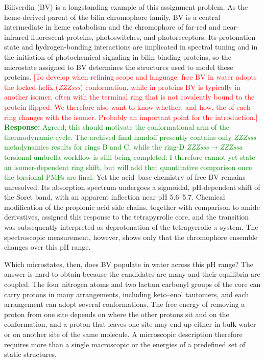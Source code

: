 Biliverdin (BV) is a longstanding example of this assignment problem.
As the heme-derived parent of the bilin chromophore family, BV is a central intermediate in heme catabolism and the chromophore of far-red and near-infrared fluorescent proteins, photoswitches, and photoreceptors.\cite{tenhunen_microsomal_1969,chernovNearInfraredFluorescentProteins2017,tangRedEdgeBilinBinding2021}
Its protonation state and hydrogen-bonding interactions are implicated in spectral tuning and in the initiation of photochemical signaling in bilin-binding proteins,\cite{modiProtonationBiliverdinIXa2019a,shankarUltrafastRemotecontrolledProtonation2025,songRedGreenCyanobacteriochrome2015,tohProtontransferHydrogenbondInteractions2010a,yangUltrafastProtoncoupledIsomerization2022a} so the microstate assigned to BV determines the structures used to model these proteins.
\textcolor{red}{[To develop when refining scope and language: free BV in water adopts the locked-helix (\textit{ZZZsss}) conformation, while in proteins BV is typically in another isomer, often with the terminal ring that is not covalently bound to the protein flipped. We therefore also want to know whether, and how, the \pka{} of each ring changes with the isomer. Probably an important point for the introduction.]}
\textcolor{green}{\textbf{Response:} Agreed; this should motivate the conformational arm of the thermodynamic cycle. The archived final handoff presently contains only \textit{ZZZsss} metadynamics results for rings B and C, while the ring-D \textit{ZZZsss}$\rightarrow$\textit{ZZZssa} torsional umbrella workflow is still being completed. I therefore cannot yet state an isomer-dependent ring \pka{} shift, but will add that quantitative comparison once the torsional PMFs are final.}
Yet the acid--base chemistry of free BV remains unresolved.
Its absorption spectrum undergoes a sigmoidal, pH-dependent shift of the Soret band, with an apparent inflection near pH 5.6--5.7.
Chemical modification of the propionic acid side chains, together with comparison to amide derivatives, assigned this response to the tetrapyrrolic core, and the transition was subsequently interpreted as deprotonation of the tetrapyrrolic $\pi$ system.\cite{shangBiliverdinAmidesReveal2010}
The spectroscopic measurement, however, shows only that the chromophore ensemble changes over this pH range.

Which microstates, then, does BV populate in water across this pH range?
The answer is hard to obtain because the candidates are many and their equilibria are coupled.
The four nitrogen atoms and two lactam carbonyl groups of the core can carry protons in many arrangements, including keto--enol tautomers, and each arrangement can adopt several conformations.\cite{villegas-escobarKetoEnolTautomerism2021a,tongManyRoadsSeam2026}
The free energy of removing a proton from one site depends on where the other protons sit and on the conformation, and a proton that leaves one site may end up either in bulk water or on another site of the same molecule.
A microscopic description therefore requires more than a single macroscopic \pka{} or the energies of a predefined set of static structures.


